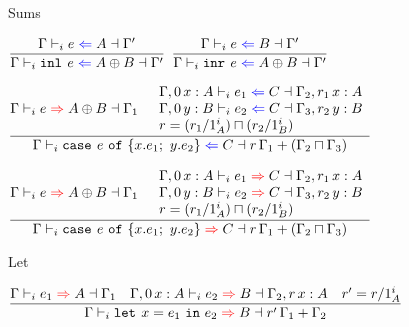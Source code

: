 \documentclass{beamer}
\begin{document}
\begin{frame}{Sums}

\begin{center}
  $\infrule{\checktype{\Gamma}{e}{A}{\Gamma'}}{\checktype{\Gamma}{\inl{e}}{\Sum{A}{B}}{\Gamma'}}$ \quad
  $\infrule{\checktype{\Gamma}{e}{B}{\Gamma'}}{\checktype{\Gamma}{\inr{e}}{\Sum{A}{B}}{\Gamma'}}$

  \vspace{2em}

  $\infrule{\infertype{\Gamma}{e}{\Sum{A}{B}}{\Gamma_1} \quad \begin{array}{l} \checktype{\extend{\Gamma}[\Zero]{x}{A}}{e_1}{C}{\extend{\Gamma_2}[r_1]{x}{A}} \\ \checktype{\extend{\Gamma}[\Zero]{y}{B}}{e_2}{C}{\extend{\Gamma_3}[r_2]{y}{B}} \\ r = \glbqty{(\divqty{r_1}{\totalqty{\One}{A}})}{(\divqty{r_2}{\totalqty{\One}{B}})} \end{array}}{\checktype{\Gamma}{\newcase{e}{x}{e_1}{y}{e_2}}{C}{\addctx{\scalectx{r}{\Gamma_1}}{(\glbctx{\Gamma_2}{\Gamma_3})}}}$

  \vspace{2em}

  $\infrule{\infertype{\Gamma}{e}{\Sum{A}{B}}{\Gamma_1} \quad \begin{array}{l} \infertype{\extend{\Gamma}[\Zero]{x}{A}}{e_1}{C}{\extend{\Gamma_2}[r_1]{x}{A}} \\ \infertype{\extend{\Gamma}[\Zero]{y}{B}}{e_2}{C}{\extend{\Gamma_3}[r_2]{y}{B}} \\ r = \glbqty{(\divqty{r_1}{\totalqty{\One}{A}})}{(\divqty{r_2}{\totalqty{\One}{B}})} \end{array}}{\infertype{\Gamma}{\newcase{e}{x}{e_1}{y}{e_2}}{C}{\addctx{\scalectx{r}{\Gamma_1}}{(\glbctx{\Gamma_2}{\Gamma_3})}}}$
\end{center}

\end{frame}

\begin{frame}{Let}

\begin{center}
  $\infrule{\infertype{\Gamma}{e_1}{A}{\Gamma_1} \quad \infertype{\extend{\Gamma}[\Zero]{x}{A}}{e_2}{B}{\extend{\Gamma_2}[r]{x}{A}} \quad r' = \divctx{r}{\totalqty{\One}{A}}}{\infertype{\Gamma}{\letin{x}{e_1}{e_2}}{B}{\addctx{\scalectx{r'}{\Gamma_1}}{\Gamma_2}}}$
\end{center}

\end{frame}
\end{document}
